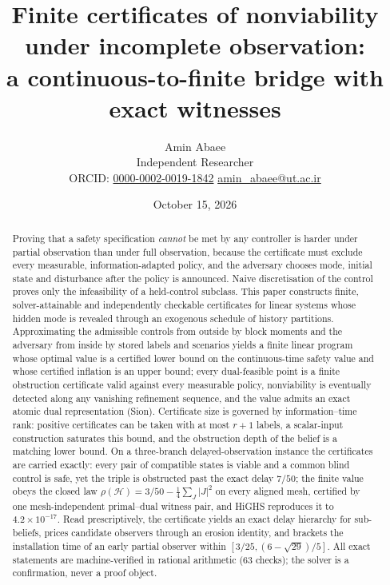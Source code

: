 \documentclass[11pt,a4paper]{article}
\theoremstyle{plain}
\theoremstyle{definition}
\theoremstyle{remark}
\newcommand{\calH}{\mathcal{H}}
\begin{document}
\title{\textbf{Finite certificates of nonviability under incomplete observation:\\ a continuous-to-finite bridge with exact witnesses}}
\author{Amin Abaee\\[0.3em]
{\small Independent Researcher}\\[0.2em]
{\small ORCID: \href{https://orcid.org/0000-0002-0019-1842}{0000-0002-0019-1842}\quad
\href{mailto:amin_abaee@ut.ac.ir}{amin\_abaee@ut.ac.ir}}}
\date{October 15, 2026}
\maketitle

\begin{abstract}
\noindent
Proving that a safety specification \emph{cannot} be met by any controller is harder under partial observation than under full observation, because the certificate must exclude every measurable, information-adapted policy, and the adversary chooses mode, initial state and disturbance after the policy is announced. Naive discretisation of the control proves only the infeasibility of a held-control subclass. This paper constructs finite, solver-attainable and independently checkable certificates for linear systems whose hidden mode is revealed through an exogenous schedule of history partitions. Approximating the admissible controls from outside by block moments and the adversary from inside by stored labels and scenarios yields a finite linear program whose optimal value is a certified lower bound on the continuous-time safety value and whose certified inflation is an upper bound; every dual-feasible point is a finite obstruction certificate valid against every measurable policy, nonviability is eventually detected along any vanishing refinement sequence, and the value admits an exact atomic dual representation (Sion). Certificate size is governed by information--time rank: positive certificates can be taken with at most $r+1$ labels, a scalar-input construction saturates this bound, and the obstruction depth of the belief is a matching lower bound. On a three-branch delayed-observation instance the certificates are carried exactly: every pair of compatible states is viable and a common blind control is safe, yet the triple is obstructed past the exact delay $7/50$; the finite value obeys the closed law $\rho(\calH)=3/50-\frac14\sum_J|J|^2$ on every aligned mesh, certified by one mesh-independent primal--dual witness pair, and HiGHS reproduces it to $4.2\times10^{-17}$. Read prescriptively, the certificate yields an exact delay hierarchy for sub-beliefs, prices candidate observers through an erosion identity, and brackets the installation time of an early partial observer within $[3/25,(6-\sqrt{29})/5]$. All exact statements are machine-verified in rational arithmetic (63 checks); the solver is a confirmation, never a proof object.
\end{abstract}
\end{document}
